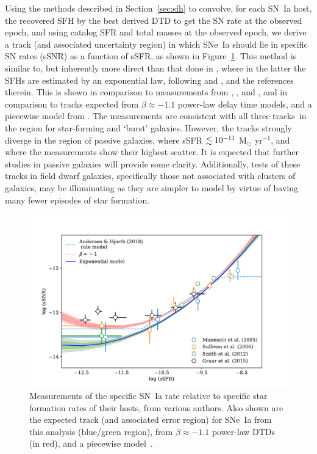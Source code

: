 \documentclass[apj, twocolumn]{aastex62}
\begin{document}
Using the methods described in Section~\ref{sec:sfh} to convolve, for each SN~Ia host, the recovered SFH by the best derived DTD to get the SN rate at the observed epoch, and using catalog SFR and total masses at the observed epoch, we derive a track (and associated uncertainty region) in which SNe~Ia should lie in specific SN rates (sSNR) as a function of sSFR, as shown in Figure~\ref{fig:ssfr}. This method is similar to, but inherently more direct than that done in \cite{Graur:2015fk}, where in the latter the SFHs are estimated by an exponential law, following \cite{Gallazzi:2005rf} and \cite{Kauffmann:2003sj}, and the references therein. This is shown in comparison to measurements from \cite{Mannucci:2005}, \cite{Sullivan:2006a}, and \cite{Smith:2012lr}, and in comparison to tracks expected from $\beta\approx-1.1$ power-law delay time models, and a piecewise model from \cite{Andersen:2018dp}. The measurements are consistent with all three tracks~{in the region for star-forming and `burst' galaxies. However, the tracks strongly diverge in the region of passive galaxies, where sSFR $\lesssim10^{-11}$ M$_{\odot}$ yr$^{-1}$, and where the measurements show their highest scatter}. It is expected that further studies in passive galaxies will provide some clarity. Additionally, tests of these tracks in field dwarf galaxies, specifically those not associated with clusters of galaxies, may be illuminating as they are simpler to model by virtue of having many fewer episodes of star formation. 

\begin{figure}[t]
   \centering
   \includegraphics[width=6.1in]{figure_ssfr.pdf}
   \caption{\footnotesize Measurements of the specific SN~Ia rate relative to specific star formation rates of their hosts, from various authors. Also shown are the expected track (and associated error region) for SNe~Ia from this analysis (blue/green region), from $\beta\approx-1.1$ power-law DTDs (in red), and a piecewise model~\cite[][ blue-dashed line]{Andersen:2018dp}.}
   \label{fig:ssfr}
\end{figure}
\end{document}
